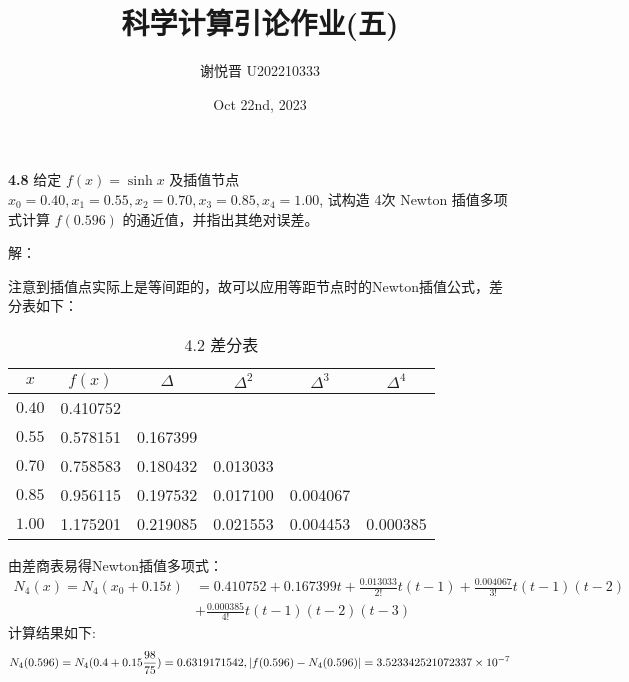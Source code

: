 \documentclass[a4paper,11pt,UTF8]{article}
\title{科学计算引论作业(五)}
\author{谢悦晋 \quad U202210333}
\date{Oct 22nd, 2023 }
\begin{document}
\maketitle
\textbf{4.8} 给定 $f(x)=\sinh x$ 及插值节点 $x_0=0.40,x_1=0.55,x_2=0.70,x_3=0.85,x_4=1.00$, 试构造 4次 Newton 插值多项式计算 $f(0.596)$ 的通近值，并指出其绝对误差。

解：

注意到插值点实际上是等间距的，故可以应用等距节点时的Newton插值公式，差分表如下：
\begin{table*}[h]
	\centering
	\caption{4.2 差分表}
	
	\begin{tabular}{|c|c|c|c|c|c|}
		\hline
		$x$ & $f(x)$ & $\Delta$ & $\Delta^2$ & $\Delta^3$ & $\Delta^4$\\
		\hline
		$0.40$ & 0.410752 &  &&&\\
		\hline
		$0.55$ & 0.578151 & 0.167399 &&&\\
		\hline
		$0.70$ & 0.758583 & 0.180432 & 0.013033&&\\
		\hline
		$0.85$ & 0.956115 & 0.197532 & 0.017100 & 0.004067&\\
		\hline
		$1.00$ & 1.175201 & 0.219085 & 0.021553 & 0.004453& 0.000385\\
		\hline
	\end{tabular}
\end{table*}
由差商表易得Newton插值多项式：
$$\begin{aligned}
	N_4(x)=N_4(x_0+0.15t)&=0.410752+0.167399t+\frac{0.013033}{2!}t(t-1)+\frac{0.004067}{3!}t(t-1)(t-2)\\&+\frac{0.000385}{4!}t(t-1)(t-2)(t-3)
\end{aligned}
$$
计算结果如下:
$$
	N_4(0.596)=N_4(0.4+0.15\frac{98}{75})=0.6319171542,\\ |f(0.596)-N_4(0.596)|=3.523342521072337\times10^{-7}
$$
\end{document}
